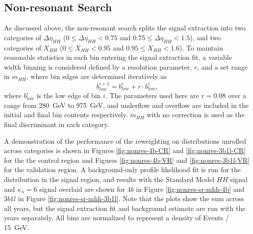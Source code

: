 \FloatBarrier
\subsection{Non-resonant Search}
As discussed above, the non-resonant search splits the signal extraction into two categories of 
$\Delta\eta_{HH}$ ($0 \leq \Delta\eta_{HH} < 0.75$ and $0.75 \leq \Delta\eta_{HH} < 1.5$), 
and two categories of $X_{HH}$ ($0 \leq X_{HH} < 0.95$ and $0.95 \leq X_{HH} < 1.6$). 
To maintain reasonable statistics in each bin entering the signal extraction fit, a 
variable width binning is considered defined by a resolution parameter, $r$, and a set range in 
$m_{HH}$, where bin edges are determined iteratively as
\begin{equation}
b_{low}^{i+1} = b_{low}^{i} + r\cdot b_{low}^{i},
\end{equation}
where $b_{low}^{i}$ is the low edge of bin $i$. The parameters used here are 
$r=0.08$ over a range from \SI{280}{\GeV} to \SI{975}{\GeV}, and underflow and 
overflow are included in the initial and final bin contents respectively. $m_{HH}$ with 
no correction is used as the final discriminant in each category.

A demonstration of the performance of the reweighting on distributions unrolled across categories is shown 
in Figures \ref{fig:nonres-4b-CR} and \ref{fig:nonres-3b1l-CR} for the the control region and 
Figures \ref{fig:nonres-4b-VR} and \ref{fig:nonres-3b1l-VR} for 
the validation region. A background-only profile likelihood fit is run for the distribution in the signal 
region, and results with the Standard Model $HH$ signal and $\kappa_{\lambda}=6$ signal overlaid are shown for $4b$ in Figure \ref{fig:nonres-sr-mhh-4b} and $3b1l$ in Figure \ref{fig:nonres-sr-mhh-3b1l}. Note that 
the plots show the sum across all years, but the signal extraction fit and background estimate are run with the 
years separately. All bins are normalized to represent a density of Events / \SI{15}{\GeV}.

